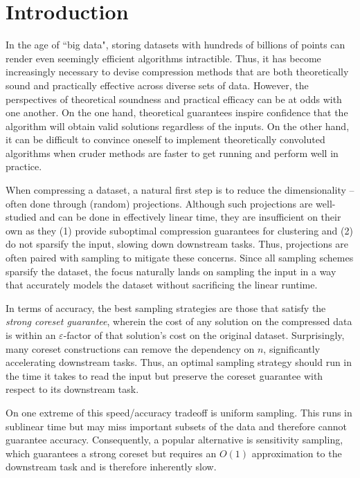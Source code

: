 \section{Introduction}

In the age of ``big data", storing datasets with hundreds of billions of points can render even seemingly efficient algorithms intractible. Thus, it has become
increasingly necessary to devise compression methods that are both theoretically sound and practically effective across diverse sets of data.
However, the perspectives of theoretical soundness and practical efficacy can be at odds with one another. On the one hand, theoretical
guarantees inspire confidence that the algorithm will obtain valid solutions regardless of the inputs. On the other hand, it can be difficult to convince
oneself to implement theoretically convoluted algorithms when cruder methods are faster to get running and perform well in practice.

When compressing a dataset, a natural first step is to reduce the dimensionality -- often done through (random) projections.
Although such projections are well-studied and can be done in effectively linear time, they are insufficient on their own as they (1) provide suboptimal compression guarantees for clustering
and (2) do not sparsify the input, slowing down downstream tasks. Thus, projections are often paired with sampling to mitigate these concerns. Since all sampling schemes
sparsify the dataset, the focus naturally lands on sampling the input in a way that accurately models the dataset without sacrificing the linear runtime.

In terms of accuracy, the best sampling strategies are those that satisfy the \emph{strong coreset guarantee}, wherein the cost of any solution on the compressed data
is within an $\varepsilon$-factor of that solution's cost on the original dataset.
Surprisingly, many coreset constructions can remove the dependency on $n$, significantly accelerating downstream tasks. Thus, an optimal sampling
strategy should run in the time it takes to read the input but preserve the coreset guarantee with respect to its downstream task.

On one extreme of this speed/accuracy tradeoff is uniform sampling. This runs in sublinear time but may miss
important subsets of the data and therefore cannot guarantee accuracy.  Consequently, a popular alternative is sensitivity sampling, which guarantees a strong
coreset but requires an $O(1)$ approximation to the downstream task and is therefore inherently slow.

